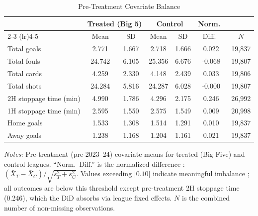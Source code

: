 \begin{table}[htbp]
\centering
\begin{threeparttable}
\caption{Pre-Treatment Covariate Balance}
\label{tab:balance}
\begin{tabular}{lcccccc}
\toprule
& \multicolumn{2}{c}{Treated (Big 5)} & \multicolumn{2}{c}{Control} & Norm.\ & \\
\cmidrule(lr){2-3} \cmidrule(lr){4-5}
& Mean & SD & Mean & SD & Diff.\ & $N$ \\
\midrule
\quad Total goals & 2.771 & 1.667 & 2.718 & 1.666 & 0.022 & 19,837 \\
\quad Total fouls & 24.742 & 6.105 & 25.356 & 6.676 & -0.068 & 19,807 \\
\quad Total cards & 4.259 & 2.330 & 4.148 & 2.439 & 0.033 & 19,806 \\
\quad Total shots & 24.284 & 5.816 & 24.287 & 6.028 & -0.000 & 19,807 \\
\quad 2H stoppage time (min) & 4.990 & 1.786 & 4.296 & 2.175 & 0.246 & 26,992 \\
\quad 1H stoppage time (min) & 2.595 & 1.550 & 2.575 & 1.549 & 0.009 & 20,998 \\
\quad Home goals & 1.533 & 1.308 & 1.514 & 1.291 & 0.010 & 19,837 \\
\quad Away goals & 1.238 & 1.168 & 1.204 & 1.161 & 0.021 & 19,837 \\
\bottomrule
\end{tabular}
\begin{tablenotes}[flushleft]
\footnotesize
\item \textit{Notes:} Pre-treatment (pre-2023--24) covariate means for treated (Big Five)
and control leagues. ``Norm.\ Diff.'' is the normalized difference
\citep{imbens2009recent}: $(\bar{X}_T - \bar{X}_C)/\sqrt{s_T^2 + s_C^2}$.
Values exceeding $|0.10|$ indicate meaningful imbalance \citep{imbens2009recent}; all outcomes are below this threshold except pre-treatment 2H stoppage time (0.246), which the DiD absorbs via league fixed effects. $N$ is the combined number of
non-missing observations.
\end{tablenotes}
\end{threeparttable}
\end{table}

